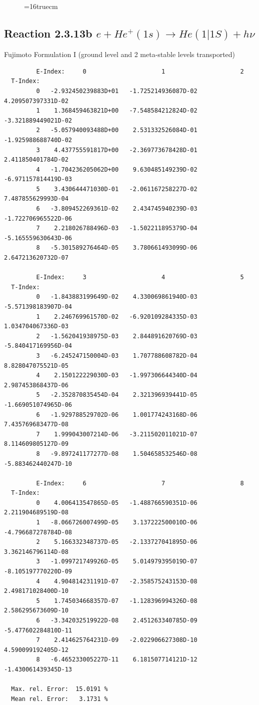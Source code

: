 \documentclass[12pt,dvips]{article}
\begin{document}
\begin{figure} \label{2.3.13a}
\epsfxsize=16truecm
\end{figure}
\newpage
\subsection{
Reaction 2.3.13b  $e + He^+(1s) \rightarrow He(1|1S) + h\nu$
}

 Fujimoto Formulation I (ground level and 2 meta-stable levels transported)


\begin{small}\begin{verbatim}
         E-Index:     0                     1                     2
  T-Index:
         0   -2.932450239883D+01   -1.725214936087D-02    4.209507397331D-02
         1    1.368459463821D+00   -7.548584212824D-02   -3.321889449021D-02
         2   -5.057940093488D+00    2.531332526084D-01   -1.925988688740D-02
         3    4.437755591817D+00   -2.369773678428D-01    2.411850401784D-02
         4   -1.704236205062D+00    9.630485149239D-02   -6.971157814419D-03
         5    3.430644471030D-01   -2.061167258227D-02    7.487855629993D-04
         6   -3.809452269361D-02    2.434745940239D-03   -1.722706965522D-06
         7    2.218026788496D-03   -1.502211895379D-04   -5.165559630643D-06
         8   -5.301589276464D-05    3.780661493099D-06    2.647213620732D-07

         E-Index:     3                     4                     5
  T-Index:
         0   -1.843883199649D-02    4.330069861940D-03   -5.571398183907D-04
         1    2.246769961570D-02   -6.920109284335D-03    1.034704067336D-03
         2   -1.562041938975D-03    2.844891620769D-03   -5.840417169956D-04
         3   -6.245247150004D-03    1.707788608782D-04    8.828047075521D-05
         4    2.150122229030D-03   -1.997306644340D-04    2.987453868437D-06
         5   -2.352870835454D-04    2.321396939441D-05   -1.669051074965D-06
         6   -1.929788529702D-06    1.001774243168D-06    7.435769683477D-08
         7    1.999043007214D-06   -3.211502011021D-07    8.114609805127D-09
         8   -9.897241177277D-08    1.504658532546D-08   -5.883462440247D-10

         E-Index:     6                     7                     8
  T-Index:
         0    4.006413547865D-05   -1.488766590351D-06    2.211904689519D-08
         1   -8.066726007499D-05    3.137222500010D-06   -4.796687278784D-08
         2    5.166332348737D-05   -2.133727041895D-06    3.362146796114D-08
         3   -1.099721749926D-05    5.014979395019D-07   -8.105197770220D-09
         4    4.904814231191D-07   -2.358575243153D-08    2.498171028400D-10
         5    1.745034668357D-07   -1.128396994326D-08    2.586295673609D-10
         6   -3.342032519922D-08    2.451263340785D-09   -5.477602284810D-11
         7    2.414625764231D-09   -2.022906627308D-10    4.590099192405D-12
         8   -6.465233005227D-11    6.181507714121D-12   -1.430061439345D-13

  Max. rel. Error:  15.0191 %
  Mean rel. Error:   3.1731 %

\end{verbatim}\end{small}
\end{document}
